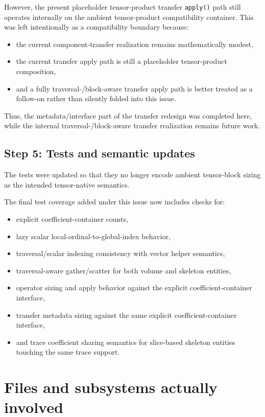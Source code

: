 \documentclass[11pt]{article}
\begin{document}
However, the present placeholder tensor-product transfer \texttt{apply()} path still operates internally on the ambient tensor-product compatibility container.  This was left intentionally as a compatibility boundary because:
\begin{itemize}[leftmargin=2em]
\item the current component-transfer realization remains mathematically modest,
\item the current transfer apply path is still a placeholder tensor-product composition,
\item and a fully traversal-/block-aware transfer apply path is better treated as a follow-on rather than silently folded into this issue.
\end{itemize}

Thus, the metadata/interface part of the transfer redesign was completed here, while the internal traversal-/block-aware transfer realization remains future work.

\subsection{Step 5: Tests and semantic updates}

The tests were updated so that they no longer encode ambient tensor-block sizing as the intended tensor-native semantics.

The final test coverage added under this issue now includes checks for:
\begin{itemize}[leftmargin=2em]
\item explicit coefficient-container counts,
\item lazy scalar local-ordinal-to-global-index behavior,
\item traversal/scalar indexing consistency with vector helper semantics,
\item traversal-aware gather/scatter for both volume and skeleton entities,
\item operator sizing and apply behavior against the explicit coefficient-container interface,
\item transfer metadata sizing against the same explicit coefficient-container interface,
\item and trace coefficient sharing semantics for slice-based skeleton entities touching the same trace support.
\end{itemize}

\section{Files and subsystems actually involved}
\end{document}
